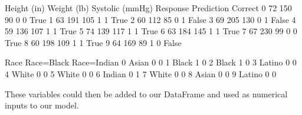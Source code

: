 \documentclass[letterpaper,10pt,english]{jupyterBook}
\begin{document}
\begin{sphinxVerbatim}[commandchars=\\\{\}]
\PYG{p}{[}\PYG{p}{]}  \PYG{p}{[}\PYG{p}{]}  
\PYG{p}{[}\PYG{p}{]}  \PYG{p}{[}\PYG{p}{]}  
\end{sphinxVerbatim}

\begin{sphinxVerbatim}[commandchars=\\\{\}]
   Height (in)  Weight (lb)  Systolic (mmHg)  Response  Prediction  Correct  \PYGZbs{}
0           72          150               90         0           0     True   
1           63          191              105         1           1     True   
2           60          112               85         0           1    False   
3           69          205              130         0           1    False   
4           59          136              107         1           1     True   
5           74          139              117         1           1     True   
6           63          184              145         1           1     True   
7           67          230               99         0           0     True   
8           60          198              109         1           1     True   
9           64          169               89         1           0    False   

     Race  Race=Black  Race=Indian  
0   Asian           0            0  
1   Black           1            0  
2   Black           1            0  
3  Latino           0            0  
4   White           0            0  
5   White           0            0  
6  Indian           0            1  
7   White           0            0  
8   Asian           0            0  
9  Latino           0            0  
\end{sphinxVerbatim}

\sphinxAtStartPar
These variables could then be added to our  DataFrame and used as numerical inputs to our model.
\end{document}

